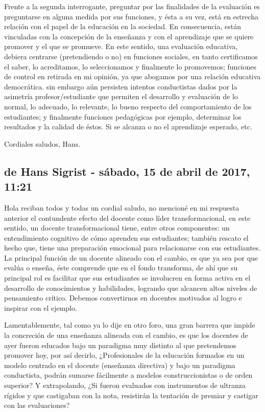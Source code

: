 \documentclass[12pt,letterpaper,article,x11names]{memoir}
\begin{document}
Frente a la segunda interrogante, preguntar por las finalidades de la evaluación es preguntarse en alguna medida por sus funciones, y ésta a su vez, está en estrecha relación con el papel de la educación en la sociedad. En consecuencia, están vinculadas con la concepción de la enseñanza y con el aprendizaje que se quiere promover y el que se promueve. En este sentido, una evaluación educativa, debiera centrarse (pretendiendo o no) en funciones sociales, en tanto certificamos el saber, lo acreditamos, lo seleccionamos y finalmente lo promovemos; funciones de control en retirada en mi opinión, ya que abogamos por una relación educativa democrática. sin embargo aún persisten intentos conductistas dados por la asimetría profesor/estudiante que permiten el desarrollo y evaluación de lo normal, lo adecuado, lo relevante, lo bueno respecto del comportamiento de los estudiantes; y finalmente funciones pedagógicas por ejemplo, determinar los resultados y la calidad de éstos. Si se alcanza o no el aprendizaje esperado, etc.

Cordiales saludos, Hans.

\subsection{de Hans Sigrist - sábado, 15 de abril de 2017, 11:21}
\label{sec:orgb2606ed}

Hola reciban todos y todas un cordial saludo, no mencioné en mi respuesta anterior el contundente efecto del docente como líder transformacional, en este sentido, un docente transformacional tiene, entre otros componentes: un entendimiento cognitivo de cómo aprenden sus estudiantes; también rescato el hecho que, tiene una preparación emocional para relacionarse con sus estudiantes. La principal función de un docente alineado con el cambio, es que ya sea por que evalúa o enseña, éste comprende que en el fondo transforma, de ahí que su principal rol es facilitar que sus estudiantes se involucren en forma activa en el desarrollo de conocimientos y habilidades, logrando que alcancen altos niveles de pensamiento crítico. Debemos convertirnos en docentes motivados al logro e inspirar con el ejemplo. 

Lamentablemente, tal como ya lo dije en otro foro, una gran barrera que impide la concreción de una enseñanza alineada con el cambio, es que los docentes de ayer fueron educados bajo un paradigma muy distinto al que pretendemos promover hoy, por así decirlo, ¿Profesionales de la educación formados en un modelo centrado en el docente (enseñanza directiva) y bajo un paradigma conductista, podrán sumarse fácilmente a modelos construccionistas o de orden superior? Y extrapolando, ¿Si fueron evaluados con instrumentos de ultranza rígidos y que castigaban con la nota, resistirán la tentación de premiar y castigar con las evaluaciones?
\end{document}
